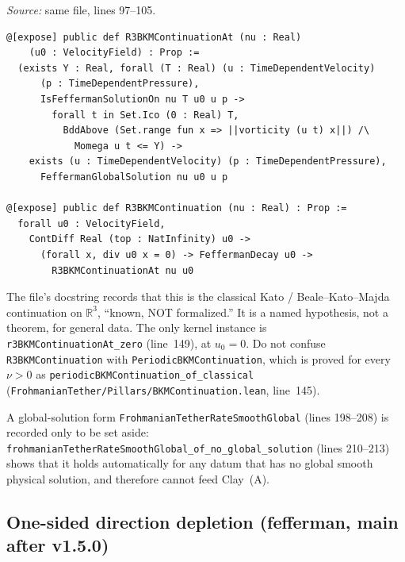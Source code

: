 \documentclass[11pt]{article}
\theoremstyle{plain}
\theoremstyle{definition}
\theoremstyle{remark}
\newcommand{\R}{\mathbb{R}}
\begin{document}
\newpage
\textit{Source:} same file, lines 97--105.
\begin{lstlisting}
@[expose] public def R3BKMContinuationAt (nu : Real)
    (u0 : VelocityField) : Prop :=
  (exists Y : Real, forall (T : Real) (u : TimeDependentVelocity)
      (p : TimeDependentPressure),
      IsFeffermanSolutionOn nu T u0 u p ->
        forall t in Set.Ico (0 : Real) T,
          BddAbove (Set.range fun x => ||vorticity (u t) x||) /\
            Momega u t <= Y) ->
    exists (u : TimeDependentVelocity) (p : TimeDependentPressure),
      FeffermanGlobalSolution nu u0 u p

@[expose] public def R3BKMContinuation (nu : Real) : Prop :=
  forall u0 : VelocityField,
    ContDiff Real (top : NatInfinity) u0 ->
      (forall x, div u0 x = 0) -> FeffermanDecay u0 ->
        R3BKMContinuationAt nu u0
\end{lstlisting}
The file's docstring records that this is the classical Kato / Beale--Kato--Majda continuation on \(\R^{3}\), ``known, NOT formalized.'' It is a named hypothesis, not a theorem, for general data. The only kernel instance is \texttt{r3BKMContinuationAt\_\hspace{0pt}zero} (line~149), at \(u_{0}=0\). Do not confuse \texttt{R3BKMContinuation} with \texttt{PeriodicBKMContinuation}, which is proved for every \(\nu>0\) as \texttt{periodicBKMContinuation\_\hspace{0pt}of\_\hspace{0pt}classical} (\texttt{FrohmanianTether/\hspace{0pt}Pillars/\hspace{0pt}BKMContinuation.\hspace{0pt}lean}, line~145).

A global-solution form \texttt{FrohmanianTetherRateSmooth\allowbreak Global} (lines 198--208) is recorded only to be set aside: \texttt{frohmanianTetherRateSmoothGlobal\_\hspace{0pt}of\_\hspace{0pt}no\_\hspace{0pt}global\_\hspace{0pt}solution} (lines 210--213) shows that it holds automatically for any datum that has no global smooth physical solution, and therefore cannot feed Clay~(A).

\subsection{One-sided direction depletion (fefferman, main after v1.5.0)}
\end{document}
